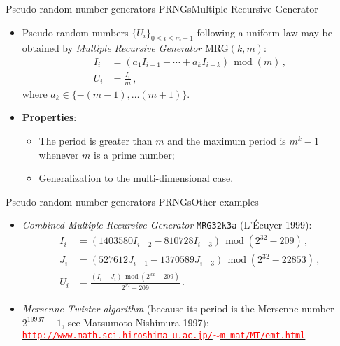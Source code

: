\documentclass{beamer}
\begin{document}
\begin{frame}{Pseudo-random number generators PRNGs}{Multiple Recursive Generator}

\begin{itemize}
\item Pseudo-random numbers $\{U_i\}_{0\leq i\leq m-1}$ following a uniform law may be obtained by \emph{Multiple Recursive Generator} MRG$(k,m)$:
\begin{displaymath}
\begin{split}
I_{i} &=(a_1I_{i-1}+\cdots+a_kI_{i-k})\,\operatorname{mod}(m)\,, \\
U_i &=\frac{I_i}{m}\,,
\end{split}
\end{displaymath}
where $a_k\in\{-(m-1),\dots(m+1)\}$.
\item {\bf Properties}:
\begin{itemize}
\item The period is greater than $m$ and the maximum period is $m^k-1$ whenever $m$ is a prime number; 
\item Generalization to the multi-dimensional case.
\end{itemize}
\end{itemize}

\end{frame}

\begin{frame}{Pseudo-random number generators PRNGs}{Other examples}

\begin{itemize}
\item \emph{Combined Multiple Recursive Generator} \texttt{MRG32k3a} ({\footnotesize L'\'Ecuyer 1999}):
\begin{displaymath}
\begin{split}
I_{i} &=(1403580I_{i-2}-810728I_{i-3})\,\operatorname{mod}(2^{32}-209)\,, \\
J_{i} &=(527612J_{i-1}-1370589J_{i-3})\,\operatorname{mod}(2^{32}-22853)\,, \\
U_i &=\frac{(I_i-J_i)\,\operatorname{mod}(2^{32}-209)}{2^{32}-209}\,.
\end{split}
\end{displaymath}
\item \emph{Mersenne Twister algorithm} ({\footnotesize because its period is the Mersenne number $2^{19937}-1$, see Matsumoto-Nishimura 1997}):\\
\footnotesize{\href{http://www.math.sci.hiroshima-u.ac.jp/~m-mat/MT/emt.html}{\textcolor{red}{\texttt{http://www.math.sci.hiroshima-u.ac.jp/$\sim$m-mat/MT/emt.html}}}}
\end{itemize}

\end{frame}
\end{document}
